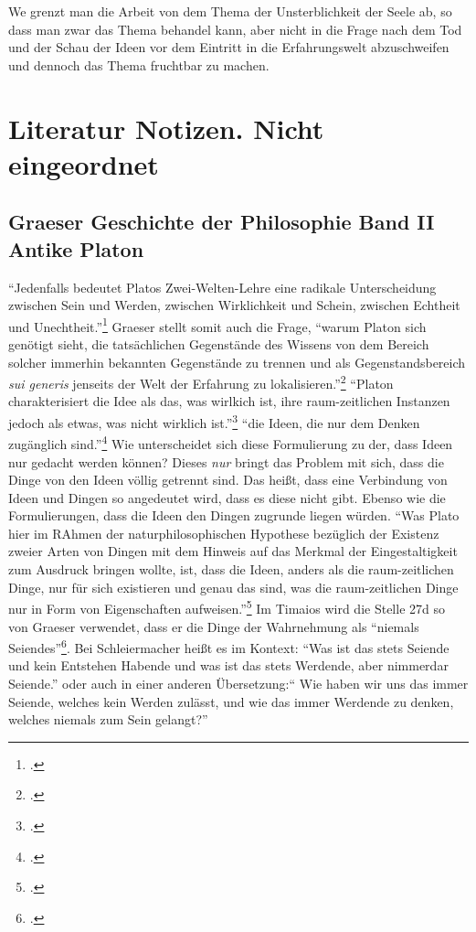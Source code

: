 \documentclass[12pt]{article}
\begin{document}
We grenzt man die Arbeit von dem Thema der Unsterblichkeit der Seele ab, so dass man zwar das Thema behandel kann, aber nicht in die Frage nach dem Tod und der Schau der Ideen vor dem Eintritt in die Erfahrungswelt abzuschweifen und dennoch das Thema fruchtbar zu machen.

\section*{Literatur Notizen. Nicht eingeordnet}
\subsection*{Graeser Geschichte der Philosophie Band II Antike Platon}
\enquote{Jedenfalls bedeutet Platos Zwei-Welten-Lehre eine radikale Unterscheidung zwischen Sein und Werden, zwischen Wirklichkeit und Schein, zwischen Echtheit und Unechtheit.}\footcite[][S. 134]{GraeserPhiloGeschichte}
Graeser stellt somit auch die Frage, \enquote{warum Platon sich genötigt sieht, die tatsächlichen Gegenstände des Wissens von dem Bereich solcher immerhin bekannten Gegenstände zu trennen und als Gegenstandsbereich \emph{sui generis} jenseits der Welt der Erfahrung zu lokalisieren.}\footcite[][S. 135]{GraeserPhiloGeschichte}
\enquote{Platon charakterisiert die Idee als das, was wirlkich ist, ihre raum-zeitlichen Instanzen jedoch als etwas, was nicht wirklich ist.}\footcite[][S. 139]{GraeserPhiloGeschichte}
\enquote{die Ideen, die nur dem Denken zugänglich sind.}\footcite[][S. 139]{GraeserPhiloGeschichte} Wie unterscheidet sich diese Formulierung zu der, dass Ideen nur gedacht werden können? Dieses \emph{nur} bringt das Problem mit sich, dass die Dinge von den Ideen völlig getrennt sind. Das heißt, dass eine Verbindung von Ideen und Dingen so angedeutet wird, dass es diese nicht gibt. Ebenso wie die Formulierungen, dass die Ideen den Dingen zugrunde liegen würden. 
\enquote{Was Plato hier im RAhmen der naturphilosophischen Hypothese bezüglich der Existenz zweier Arten von Dingen mit dem Hinweis auf das Merkmal der Eingestaltigkeit zum Ausdruck bringen wollte, ist, dass die Ideen, anders als die raum-zeitlichen Dinge, nur für sich existieren und genau das sind, was die raum-zeitlichen Dinge nur in Form von Eigenschaften aufweisen.}\footcite[][S. 140]{GraeserPhiloGeschichte}
Im Timaios wird die Stelle 27d so von Graeser verwendet, dass er die Dinge der Wahrnehmung als \enquote{niemals Seiendes}\footcite[vgl.][S. 140]{GraeserPhiloGeschichte}. Bei Schleiermacher heißt es im Kontext: \enquote{Was ist das stets Seiende und kein Entstehen Habende und was ist das stets Werdende, aber nimmerdar Seiende.} oder auch in einer anderen Übersetzung:\enquote{ Wie haben
wir uns das immer Seiende, welches kein Werden zulässt, und wie das immer Werdende zu denken, welches niemals zum Sein gelangt?}
\end{document}

